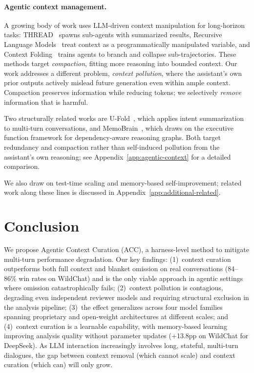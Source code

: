\documentclass{article}
\begin{document}
\paragraph{Agentic context management.}
A growing body of work uses LLM-driven context manipulation for long-horizon tasks: THREAD~\citep{schroeder2025thread} spawns sub-agents with summarized results, Recursive Language Models~\citep{zhang2025rlm} treat context as a programmatically manipulated variable, and Context Folding~\citep{sun2025contextfolding} trains agents to branch and collapse sub-trajectories. These methods target \emph{compaction}, fitting more reasoning into bounded context. Our work addresses a different problem, \emph{context pollution}, where the assistant's own prior outputs actively mislead future generation even within ample context. Compaction preserves information while reducing tokens; we selectively \emph{remove} information that is harmful.

Two structurally related works are U-Fold~\citep{su2026ufold}, which applies intent summarization to multi-turn conversations, and MemoBrain~\citep{qian2026memobrain}, which draws on the executive function framework for dependency-aware reasoning graphs. Both target redundancy and compaction rather than self-induced pollution from the assistant's own reasoning; see Appendix~\ref{app:agentic-context} for a detailed comparison.

We also draw on test-time scaling and memory-based self-improvement; related work along these lines is discussed in Appendix~\ref{app:additional-related}.


\section{Conclusion}
\label{sec:conclusion}

We propose Agentic Context Curation (ACC), a harness-level method to mitigate multi-turn performance degradation. Our key findings: (1)~context curation outperforms both full context and blanket omission on real conversations (84--86\% win rates on WildChat) and is the only viable approach in agentic settings where omission catastrophically fails; (2)~context pollution is contagious, degrading even independent reviewer models and requiring structural exclusion in the analysis pipeline; (3)~the effect generalizes across four model families spanning proprietary and open-weight architectures at different scales; and (4)~context curation is a learnable capability, with memory-based learning improving analysis quality without parameter updates (+13.8pp on WildChat for DeepSeek). As LLM interaction increasingly involves long, stateful, multi-turn dialogues, the gap between context removal (which cannot scale) and context curation (which can) will only grow.
\end{document}
